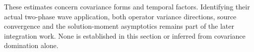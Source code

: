 These estimates concern covariance forms and temporal factors. Identifying
their actual two-phase wave application, both operator variance directions,
source convergence and the solution-moment asymptotics remains part of
the later integration work. None is established in this section or inferred
from covariance domination alone.
